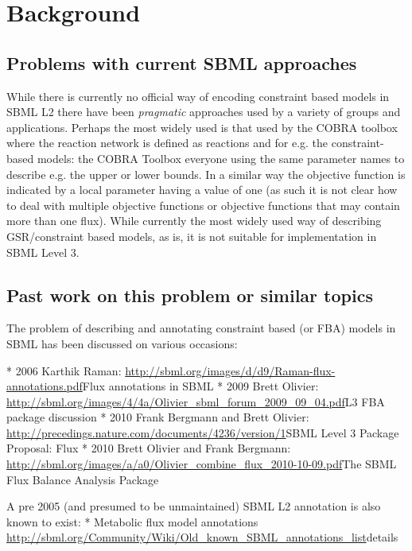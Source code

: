 
\section{ Background }
\label{background}

\subsection{ Problems with current SBML approaches }

While there is currently no official way of encoding constraint
based models in SBML L2 there have been \textit{pragmatic}
approaches used by a variety of groups and applications. Perhaps
the most widely used is that used by the COBRA toolbox
%
%
where the reaction network is defined as reactions and for e.g. the constraint-based models: the COBRA Toolbox everyone using the same parameter names to describe e.g. the upper or lower bounds. In a similar way the objective function is indicated by a local parameter having a value of one (as such it is not clear how to deal with multiple objective functions or objective functions that may contain more than one flux). While currently the most widely used way of describing GSR/constraint based models, as is, it is not suitable for implementation in SBML Level 3.

\subsection{ Past work on this problem or similar topics }
The problem of describing and annotating constraint based (or FBA) models in SBML has
been discussed on various occasions:

* 2006 Karthik Raman: \url{http://sbml.org/images/d/d9/Raman-flux-annotations.pdf}{Flux
annotations in SBML}
* 2009 Brett Olivier: \url{http://sbml.org/images/4/4a/Olivier_sbml_forum_2009_09_04.pdf}{L3
FBA package discussion}
* 2010 Frank Bergmann and Brett Olivier:
\url{http://precedings.nature.com/documents/4236/version/1}{SBML Level 3 Package Proposal:
Flux}
* 2010 Brett Olivier and Frank Bergmann:
\url{http://sbml.org/images/a/a0/Olivier_combine_flux_2010-10-09.pdf}{The SBML Flux Balance
Analysis Package}

A pre 2005 (and presumed to be unmaintained) SBML L2 annotation is also known to exist:
* Metabolic flux model annotations
\url{http://sbml.org/Community/Wiki/Old_known_SBML_annotations_list}{details}
